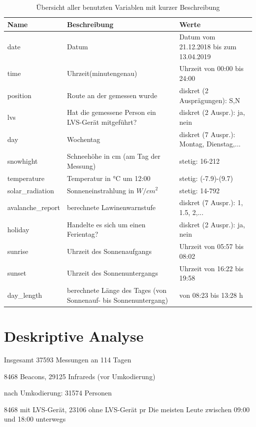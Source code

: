 \documentclass[11pt,a4paper]{report}
\begin{document}
\begin{table}
\caption{Übersicht aller benutzten Variablen mit kurzer Beschreibung}
\begin{tabular}{p{3cm}|p{5cm}|p{4cm}}
Name & Beschreibung & Werte \\
\hline
date & Datum & Datum vom 21.12.2018 bis zum 13.04.2019 \\
\hline
time & Uhrzeit(minutengenau) & Uhrzeit von 00:00 bis 24:00 \\
\hline
position & Route an der gemessen wurde & diskret (2 Ausprägungen): S,N \\
\hline
lvs & Hat die gemessene Person ein LVS-Gerät mitgeführt? & diskret (2 Auspr.): ja, nein \\
\hline
day & Wochentag & diskret (7 Auspr.): Montag, Dienstag,... \\
\hline
snowhight & Schneehöhe in cm (am Tag der Messung) & stetig: 16-212 \\
\hline
temperature & Temperatur in °C um 12:00 & stetig: (-7.9)-(9.7) \\
\hline
solar\_radiation & Sonneneinstrahlung in $W/cm^2$ & stetig: 14-792 \\
\hline
avalanche\_report & berechnete Lawinenwarnstufe & diskret (7 Auspr.): 1, 1.5, 2,... \\
\hline
holiday & Handelte es sich um einen Ferientag? & diskret (2 Auspr.): ja, nein \\
\hline
sunrise & Uhrzeit des Sonnenaufgangs & Uhrzeit von 05:57 bis 08:02 \\
\hline
sunset & Uhrzeit des Sonnenuntergangs & Uhrzeit von 16:22 bis 19:58 \\
\hline
day\_length & berechnete Länge des Tages (von Sonnenauf- bis Sonnenuntergang) & von 08:23 bis 13:28 h \\
\hline
\end{tabular}
\label{tab:var}
\end{table}

\section{Deskriptive Analyse}

Insgesamt 37593 Messungen an 114 Tagen

8468 Beacons, 29125 Infrareds (vor Umkodierung)

nach Umkodierung: 31574 Personen

8468 mit LVS-Gerät, 23106 ohne LVS-Gerät
pr
Die meisten Leute zwischen 09:00 und 18:00 unterwegs
\end{document}
